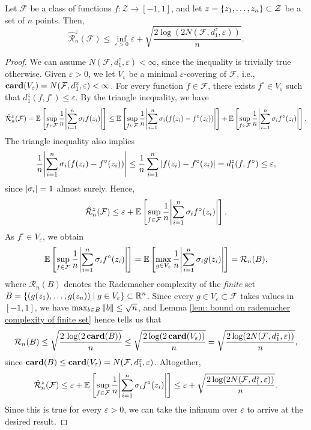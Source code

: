 \begin{theorem}
\label{thm: bound on conditional rademacher average}
Let $\mathcal{F}$ be a class of functions $f \colon \mathcal{Z} \to [-1, 1]$, and let $z = \left\{z_1, \dots, z_n\right\} \subset \mathcal{Z}$ be a set of $n$ points. Then,
\[
    \hat{\mathcal{R}}_n^z(\mathcal{F}) \leq \inf_{\varepsilon > 0} \varepsilon + \sqrt{\frac{2 \log(2 N(\mathcal{F}, d_1^z, \varepsilon))}{n}}.
\]
\end{theorem}

\begin{proof}
We can assume $N(\mathcal{F}, d_1^z, \varepsilon) < \infty$, since the inequality is trivially true otherwise. Given $\varepsilon > 0$, we let $V_{\varepsilon}$ be a minimal $\varepsilon$-covering of $\mathcal{F}$, i.e., $\mathrm{\mathbf{card}}(V_{\varepsilon}) = N(\mathcal{F}, d_1^z, \varepsilon) < \infty$. For every function $f \in \mathcal{F}$, there exists $f^{\circ} \in V_{\varepsilon}$ such that $d_1^z(f, f^{\circ}) \leq \varepsilon$. By the triangle inequality, we have
\[
    \hat{\mathcal{R}}_n^z(\mathcal{F}) = \mathbb{E}\left[ \sup_{f \in \mathcal{F}} \frac{1}{n} \abs{\sum_{i=1}^n \sigma_i f(z_i)} \right] \leq \mathbb{E}\left[ \sup_{f \in \mathcal{F}} \frac{1}{n} \abs{\sum_{i=1}^n \sigma_i ( f(z_i) - f^{\circ}(z_i))} \right] + \mathbb{E}\left[ \sup_{f \in \mathcal{F}} \frac{1}{n} \abs{\sum_{i=1}^n \sigma_i f^{\circ}(z_i)} \right].
\]
The triangle inequality also implies
\[
    \frac{1}{n} \abs{\sum_{i=1}^n \sigma_i ( f(z_i) - f^{\circ}(z_i))} \leq \frac{1}{n} \sum_{i=1}^n \abs{ f(z_i) - f^{\circ}(z_i) } = d_1^z(f, f^{\circ}) \leq \varepsilon,
\]
since $\abs{\sigma_i} = 1$ almost surely. Hence,
\[
    \hat{\mathcal{R}}_n^z(\mathcal{F}) \leq \varepsilon + \mathbb{E}\left[ \sup_{f \in \mathcal{F}} \frac{1}{n} \abs{\sum_{i=1}^n \sigma_i f^{\circ}(z_i)} \right].
\]
As $f^{\circ} \in V_{\varepsilon}$, we obtain
\[
    \mathbb{E}\left[ \sup_{f \in \mathcal{F}} \frac{1}{n} \abs{\sum_{i=1}^n \sigma_i f^{\circ}(z_i)} \right] = \mathbb{E}\left[ \max_{g \in V_{\varepsilon}} \frac{1}{n} \abs{\sum_{i=1}^n \sigma_i g(z_i)} \right] = \mathcal{R}_n(B),
\]
where $\mathcal{R}_n(B)$ denotes the Rademacher complexity of the \emph{finite} set $B = \left\{ (g(z_1), \dots, g(z_n)) \mathrel{|} g \in V_{\varepsilon} \right\} \subset \mathbb{R}^n$. Since every $g \in V_{\varepsilon} \subset \mathcal{F}$ takes values in $[-1, 1]$, we have $\max_{b \in B} \norm{b} \leq \sqrt{n}$, and Lemma \ref{lem: bound on rademacher complexity of finite set} hence tells us that
\[
    \mathcal{R}_n(B) \leq \sqrt{ \frac{2 \, \log(2 \, \mathrm{\mathbf{card}}(B))}{n} } \leq \sqrt{ \frac{2 \, \mathrm{log}(2 \, \mathrm{\mathbf{card}}(V_{\varepsilon}))}{n} } = \sqrt{ \frac{2 \, \mathrm{log}(2 N(\mathcal{F}, d_1^z, \varepsilon))}{n} },
\]
since $\mathrm{\mathbf{card}}(B) \leq \mathrm{\mathbf{card}}(V_{\varepsilon}) = N(\mathcal{F}, d_1^z, \varepsilon)$. Altogether,
\[
    \hat{\mathcal{R}}_n^z(\mathcal{F}) \leq \varepsilon + \mathbb{E}\left[ \sup_{f \in \mathcal{F}} \frac{1}{n} \abs{\sum_{i=1}^n \sigma_i f^{\circ}(z_i)} \right] \leq \varepsilon + \sqrt{ \frac{2 \, \mathrm{log}(2 N(\mathcal{F}, d_1^z, \varepsilon))}{n} }.
\]
Since this is true for every $\varepsilon > 0$, we can take the infimum over $\varepsilon$ to arrive at the desired result.
\end{proof}

